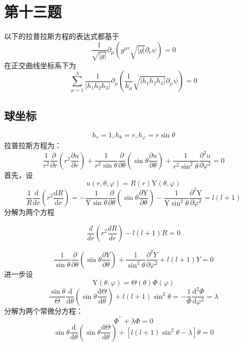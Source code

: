 \documentclass[a4paper]{ctexart}
\begin{document}
\section{第十三题}
以下的拉普拉斯方程的表达式都基于
$$
    \frac{1}{\sqrt{|g|}} \partial_{\mu}\left(g^{\mu v} \sqrt{|g|} \partial_{v} \psi\right)=0
$$
在正交曲线坐标系下为
$$
    \sum_{\mu =1}^3{\frac{1}{|h_1h_2h_3|}\partial _{\mu}\left( \frac{1}{h_{\mu}}\sqrt{|h_1h_2h_3|}\partial _{\mu}\psi \right)}=0
$$

\subsection{球坐标}
$$
    h_r=1,h_{\theta}=r,h_{\varphi}=r\sin \theta
$$
拉普拉斯方程为：
\[
    \frac{1}{r^{2}} \frac{\partial}{\partial r}\left(r^{2} \frac{\partial u}{\partial r}\right)+\frac{1}{r^{2} \sin \theta} \frac{\partial}{\partial \theta}\left(\sin \theta \frac{\partial u}{\partial \theta}\right)+\frac{1}{r^{2} \sin ^{2} \theta} \frac{\partial^{2} u}{\partial \varphi^{2}}=0
\]
首先，设
\[
    u(r, \theta, \varphi)=R(r) \mathrm{Y}(\theta, \varphi)
\]
\[
    \frac{1}{R} \frac{\mathrm{d}}{\mathrm{d} r}\left(r^{2} \frac{\mathrm{d} R}{\mathrm{d} r}\right)=-\frac{1}{\mathrm{Y} \sin \theta} \frac{\partial}{\partial \theta}\left(\sin \theta \frac{\partial \mathrm{Y}}{\partial \theta}\right)-\frac{1}{\mathrm{Y} \sin ^{2} \theta} \frac{\partial^{2} \mathrm{Y}}{\partial \varphi^{2}}=l(l+1)
\]
分解为两个方程

\begin{equation}
    \frac{d}{d r}\left(r^{2} \frac{d R}{d r}\right)-l(l+1) R = 0
\end{equation}

\[
    \frac{1}{\sin \theta} \frac{\partial}{\partial \theta}\left(\sin \theta \frac{\partial Y}{\partial \theta}\right)+\frac{1}{\sin ^{2} \theta} \frac{\partial^{2} Y}{\partial \varphi^{2}}+l(l+1) Y=0
\]
进一步设
\[
    \mathrm{Y}(\theta, \varphi)=\Theta(\theta) \Phi(\varphi)
\]
\[
    \frac{\sin \theta}{\Theta} \frac{\mathrm{d}}{\mathrm{d} \theta}\left(\sin \theta \frac{\mathrm{d} \Theta}{\mathrm{d} \theta}\right)+l(l+1) \sin ^{2} \theta=-\frac{1}{\Phi} \frac{\mathrm{d}^{2} \Phi}{\mathrm{d} \varphi^{2}}=\lambda
\]
分解为两个常微分方程：
\begin{equation}
    \Phi^{\prime \prime}+\lambda \Phi=0
\end{equation}
\begin{equation}
    \sin \theta \frac{\mathrm{d}}{\mathrm{d} \theta}\left(\sin \theta \frac{\mathrm{d} \Theta}{\mathrm{d} \theta}\right)+\left[l(l+1) \sin ^{2} \theta-\lambda\right] \theta=0
\end{equation}
\end{document}
